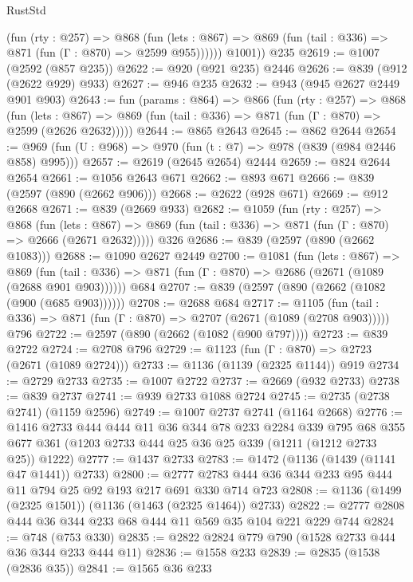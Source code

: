 \begin{lexlean}{RustStd}
\begin{coremodule}
{\begin{coremodule}
{{{{{{{{            (fun (rty : @257) =>
            @868
              (fun (lets : @867) =>
              @869 (fun (tail : @336) => @871 (fun (Γ : @870) => @2599 @955))))))
        @1001))
    @235
@2619 := @1007 (@2592 (@857 @235))
@2622 := @920 (@921 @235) @2446
@2626 := @839 (@912 (@2622 @929) @933)
@2627 := @946 @235
@2632 := @943 (@945 @2627 @2449 @901 @903)
@2643 := fun (params : @864) =>
  @866
    (fun (rty : @257) =>
    @868
      (fun (lets : @867) =>
      @869 (fun (tail : @336) => @871 (fun (Γ : @870) => @2599 (@2626 @2632)))))
@2644 := @865 @2643
@2645 := @862 @2644
@2654 := @969 (fun (U : @968) => @970 (fun (t : @7) => @978 (@839 (@984 @2446 @858) @995)))
@2657 := @2619 (@2645 @2654) @2444
@2659 := @824 @2644 @2654
@2661 := @1056 @2643 @671
@2662 := @893 @671
@2666 := @839 (@2597 (@890 (@2662 @906)))
@2668 := @2622 (@928 @671)
@2669 := @912 @2668
@2671 := @839 (@2669 @933)
@2682 := @1059
    (fun (rty : @257) =>
    @868
      (fun (lets : @867) =>
      @869 (fun (tail : @336) => @871 (fun (Γ : @870) => @2666 (@2671 @2632)))))
    @326
@2686 := @839 (@2597 (@890 (@2662 @1083)))
@2688 := @1090 @2627 @2449
@2700 := @1081
    (fun (lets : @867) =>
    @869 (fun (tail : @336) => @871 (fun (Γ : @870) => @2686 (@2671 (@1089 (@2688 @901 @903))))))
    @684
@2707 := @839 (@2597 (@890 (@2662 (@1082 (@900 (@685 @903))))))
@2708 := @2688 @684
@2717 := @1105
    (fun (tail : @336) => @871 (fun (Γ : @870) => @2707 (@2671 (@1089 (@2708 @903)))))
    @796
@2722 := @2597 (@890 (@2662 (@1082 (@900 @797))))
@2723 := @839 @2722
@2724 := @2708 @796
@2729 := @1123 (fun (Γ : @870) => @2723 (@2671 (@1089 @2724)))
@2733 := @1136 (@1139 (@2325 @1144)) @919
@2734 := @2729 @2733
@2735 := @1007 @2722
@2737 := @2669 (@932 @2733)
@2738 := @839 @2737
@2741 := @939 @2733 @1088 @2724
@2745 := @2735 (@2738 @2741) (@1159 @2596)
@2749 := @1007 @2737 @2741 (@1164 @2668)
@2776 := @1416
    @2733
    @444
    @444
    @11
    @36
    @344
    @78
    @233
    @2284
    @339
    @795
    @68
    @355
    @677
    @361
    (@1203 @2733 @444 @25 @36 @25 @339 (@1211 (@1212 @2733 @25)) @1222)
@2777 := @1437 @2733
@2783 := @1472 (@1136 (@1439 (@1141 @47 @1441)) @2733)
@2800 := @2777 @2783 @444 @36 @344 @233 @95 @444 @11 @794 @25 @92 @193 @217 @691 @330 @714 @723
@2808 := @1136 (@1499 (@2325 @1501)) (@1136 (@1463 (@2325 @1464)) @2733)
@2822 := @2777 @2808 @444 @36 @344 @233 @68 @444 @11 @569 @35 @104 @221 @229 @744
@2824 := @748 (@753 @330)
@2835 := @2822 @2824 @779 @790 (@1528 @2733 @444 @36 @344 @233 @444 @11)
@2836 := @1558 @233
@2839 := @2835 (@1538 (@2836 @35))
@2841 := @1565 @36 @233
}}}}}}}}
\end{coremodule}}
\end{coremodule}
\end{lexlean}
